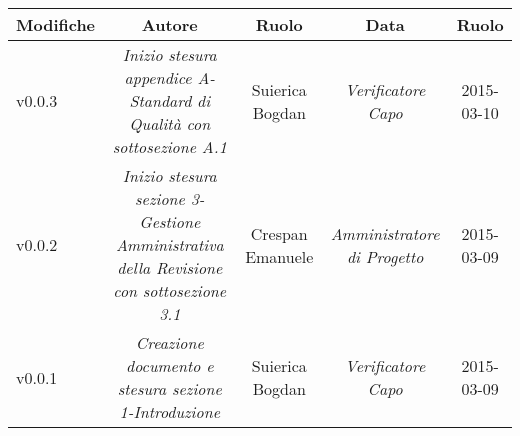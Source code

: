 \newpage

\begin{table}[h]
\centering
\begin{tabular}{|p{}|c|c|c|c|}
	\toprule
		\textbf{Modifiche} & \textbf{Autore} & \textbf{Ruolo} & \textbf{Data} & \textbf{Ruolo} \\
	\midrule
	\midrule
		v0.0.3 & \textit{Inizio stesura appendice A-Standard di Qualità con sottosezione A.1} & Suierica Bogdan & \textit{Verificatore Capo} & 2015-03-10\\
	\midrule
		v0.0.2 & \textit{Inizio stesura sezione 3-Gestione Amministrativa della Revisione con sottosezione 3.1} & Crespan Emanuele & \textit{Amministratore di Progetto} & 2015-03-09 & \\
	\midrule
		v0.0.1 & \textit{Creazione documento e stesura sezione 1-Introduzione} & Suierica Bogdan & \textit{Verificatore Capo} & 2015-03-09\\
	\bottomrule
\end{tabular}
\end{table}

\newpage
